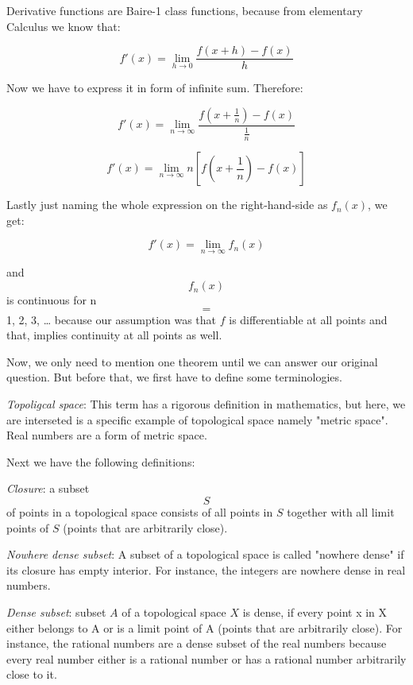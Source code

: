 \documentclass[11pt]{article}
\begin{document}
Derivative functions are Baire-1 class functions, because from elementary Calculus we know that:

\begin{equation}
  f'(x) = \lim_{h\to0} \frac{f(x + h) - f(x)}{h}
\end{equation}

Now we have to express it in form of infinite sum. Therefore:

\begin{equation}
  f'(x) = \lim_{n\to\infty} \frac{f(x + \frac{1}{n}) - f(x)}{\frac{1}{n}}
\end{equation}

\begin{equation}
  f'(x) = \lim_{n\to\infty} n [f(x + \frac{1}{n}) - f(x)]
\end{equation}

Lastly just naming the whole expression on the right-hand-side as \(f_n(x)\), we get:

\begin{equation}
  f'(x) = \lim_{n\to\infty} {f_n(x)}
\end{equation}

and $$f_n(x)$$ is continuous for n $$=$$ 1, 2, 3, \ldots{} because our assumption was that \(f\) is differentiable at all points and that, implies continuity at all points as well.

Now, we only need to mention one theorem until we can answer our original question. But before that, we first have to define some terminologies.

\emph{Topoligcal space}: This term has a rigorous definition in mathematics, but here, we are interseted is a specific example of topological space namely "metric space".
Real numbers are a form of metric space.

Next we have the following definitions:

\emph{Closure}: a subset $$S$$ of points in a topological space consists of all points in \(S\) together with all limit points of \(S\) (points that are arbitrarily close).

\emph{Nowhere dense subset}: A subset of a topological space is called "nowhere dense" if its closure has empty interior.
For instance, the integers are nowhere dense in real numbers.

\emph{Dense subset}:  subset \(A\) of a topological space \(X\) is dense, if every point x in X either belongs to A or is a limit point of A (points that are arbitrarily close).
For instance, the rational numbers are a dense subset of the real numbers because every real number either is a rational number or has a rational number arbitrarily close to it.
\end{document}
